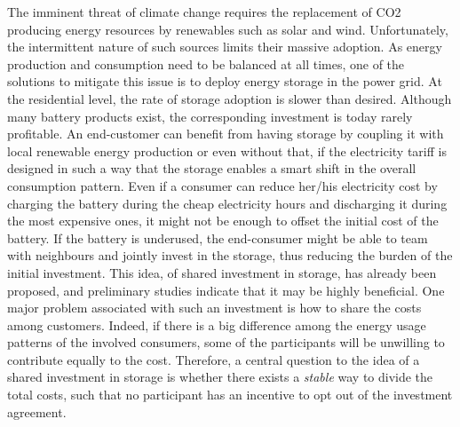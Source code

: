 \documentclass[sigconf, table]{acmart}
\begin{document}
The imminent threat of climate change requires the replacement of CO2 producing energy resources by renewables such as solar and wind. Unfortunately, the intermittent nature of such sources limits their massive adoption.
As energy production and consumption need to be balanced at all times, one of the solutions to mitigate this issue is to deploy energy storage in the power grid.
At the residential level, the rate of storage adoption is slower than desired. Although many battery products exist, the corresponding investment is today rarely profitable.
An end-customer can benefit from having storage by coupling it with local renewable energy production or even without that, if the electricity tariff is designed in such a way that the storage enables a smart shift in the overall consumption pattern. 
Even if a consumer can reduce her/his electricity cost by charging the battery during the cheap electricity hours and discharging it during the most expensive ones, it might not be enough to offset the initial cost of the battery.
If the battery is underused, the end-consumer might be able to team with neighbours and jointly invest in the storage, thus reducing the burden of the initial investment.
This idea, of shared investment in storage, has already been proposed, and preliminary studies indicate that it may be highly beneficial.
One major problem associated with such an investment is how to share the costs among customers.
Indeed, if there is a big difference among the energy usage patterns of the involved consumers, some of the participants will be unwilling to contribute equally to the cost.
Therefore, a central question to the idea of a shared investment in storage is whether there exists a \textit{stable} way to divide the total costs, such that no participant has an incentive to opt out of the investment agreement.
\end{document}
